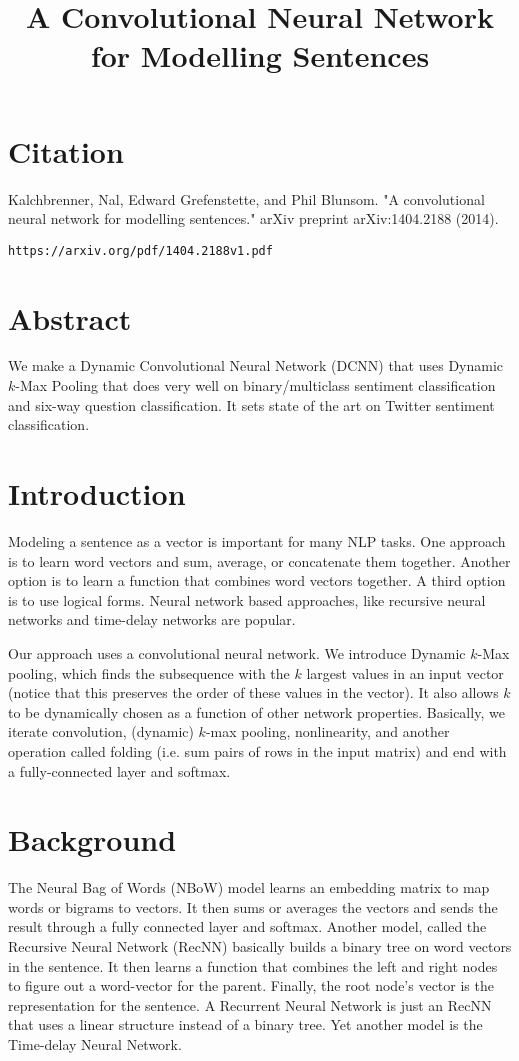 \documentclass[a4paper]{article}
\title{A Convolutional Neural Network for Modelling Sentences}
\date{}
\begin{document}
\maketitle

\section{Citation}
Kalchbrenner, Nal, Edward Grefenstette, and Phil Blunsom. "A convolutional neural network for modelling sentences." arXiv preprint arXiv:1404.2188 (2014).

\begin{verbatim}
https://arxiv.org/pdf/1404.2188v1.pdf
\end{verbatim}

\section{Abstract}
We make a Dynamic Convolutional Neural Network (DCNN) that uses Dynamic $k$-Max
Pooling that does very well on binary/multiclass sentiment classification
and six-way question classification. It sets state of the art on Twitter
sentiment classification.

\section{Introduction}
Modeling a sentence as a vector is important for many NLP tasks. One approach
is to learn word vectors and sum, average, or concatenate them together. Another
option is to learn a function that combines word vectors together. A third
option is to use logical forms. Neural network based approaches, like recursive
neural networks and time-delay networks are popular.

Our approach uses a convolutional neural network. We introduce Dynamic $k$-Max
pooling, which finds the subsequence with the $k$ largest values in an
input vector (notice that this preserves the order of these values in the
vector). It also allows $k$ to be dynamically chosen as a function of other
network properties. Basically, we iterate convolution, (dynamic) $k$-max
pooling, nonlinearity, and another operation called folding (i.e. sum pairs
of rows in the input matrix) and end with a fully-connected layer and softmax.

\section{Background}
The Neural Bag of Words (NBoW) model learns an embedding matrix to map words
or bigrams to vectors. It then sums or averages the vectors and sends the
result through a fully connected layer and softmax. Another model, called
the Recursive Neural Network (RecNN) basically builds a binary tree on word
vectors in the sentence. It then learns a function that combines the left
and right nodes to figure out a word-vector for the parent. Finally, the root
node's vector is the representation for the sentence. A Recurrent Neural Network
is just an RecNN that uses a linear structure instead of a binary tree. Yet
another model is the Time-delay Neural Network.
\end{document}
